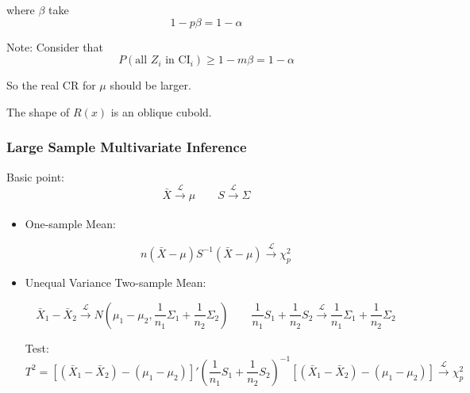 \begin{itemize}
    where $ \beta  $ take 
    \begin{equation}
        1-p\beta =1-\alpha  
    \end{equation}
    
    Note: Consider that
    \begin{equation}
        P(\text{all }Z_i\text{ in CI}_i)\geq 1-m\beta =1-\alpha  
    \end{equation}

    So the real CR for $ \mu $ should be larger.
    
    
    
    
    
    
    
    


    The shape of $ R(x) $ is an oblique cubold.
    
\end{itemize}
        





\subsubsection{Large Sample Multivariate Inference}
    Basic point:
    \begin{equation}
        \bar{X}\xrightarrow[]{\mathscr{L}} \mu\qquad S\xrightarrow[]{\mathscr{L}} \Sigma  
    \end{equation}
\begin{itemize}[topsep=2pt,itemsep=2pt]
    \item One-sample Mean:
    
    \begin{equation}
        n(\bar{X}-\mu)S^{-1}(\bar{X}-\mu)\xrightarrow[]{\mathscr{L}} \chi^2_p 
    \end{equation}

    \item Unequal Variance Two-sample Mean:
    
    \begin{equation}
        \bar{X}_1-\bar{X}_2\xrightarrow[]{\mathscr{L}} N\left(\mu_1-\mu _2,\dfrac{1}{n_1}\Sigma _1+\dfrac{1}{n_2}\Sigma _2\right) \qquad \dfrac{1}{n_1}S_1+\dfrac{1}{n_2}S_2\xrightarrow[]{\mathscr{L}} \dfrac{1}{n_1}\Sigma _1+\dfrac{1}{n_2}\Sigma _2
    \end{equation}

    Test:
    \begin{equation}
        T^2=\left[(\bar{X}_1-\bar{X}_2)-(\mu _1-\mu _2) \right]'(\dfrac{1}{n_1}S_1+\dfrac{1}{n_2}S_2)^{-1}\left[(\bar{X}_1-\bar{X}_2)-(\mu _1-\mu _2) \right]\xrightarrow[]{\mathscr{L}} \chi^2_p
    \end{equation}
    
    
    
    
\end{itemize}

